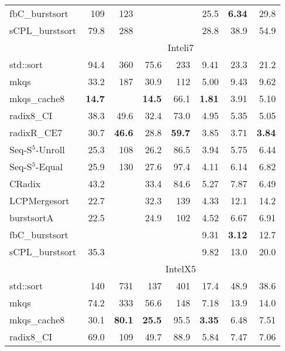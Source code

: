 \documentclass[a4paper]{myjournal}
\begin{document}
\begin{table}[p]
\begin{tabular}{l|rrrr rrr|}
  fbC\_burstsort &      109 &     123 &          &         &     25.5 & \bf 6.34 &     29.8 \\
 sCPL\_burstsort &     79.8 &     288 &          &         &     28.8 &     38.9 &     54.9 \\ \hline
& \multicolumn{7}{c|}{Inteli7} \\ \cline{2-8}
std::sort &     94.4 &      360 &     75.6 &      233 &     9.41 &     23.3 &     21.2 \\
            mkqs &     33.2 &      187 &     30.9 &      112 &     5.00 &     9.43 &     9.62 \\
    mkqs\_cache8 & \bf 14.7 &          & \bf 14.5 &     66.1 & \bf 1.81 &     3.91 &     5.10 \\
      radix8\_CI &     38.3 &     49.6 &     32.4 &     73.0 &     4.95 &     5.35 &     5.05 \\
     radixR\_CE7 &     30.7 & \bf 46.6 &     28.8 & \bf 59.7 &     3.85 &     3.71 & \bf 3.84 \\
Seq-S$^5$-Unroll &     25.3 &      108 &     26.2 &     86.5 &     3.94 &     5.75 &     6.44 \\
 Seq-S$^5$-Equal &     25.9 &      130 &     27.6 &     97.4 &     4.11 &     6.14 &     6.82 \\
          CRadix &     43.2 &          &     33.4 &     84.6 &     5.27 &     7.87 &     6.49 \\
    LCPMergesort &     22.7 &          &     32.3 &      139 &     4.33 &     12.1 &     14.2 \\
      burstsortA &     22.5 &          &     24.9 &      102 &     4.52 &     6.67 &     6.91 \\
  fbC\_burstsort &          &          &          &          &     9.31 & \bf 3.12 &     12.7 \\
 sCPL\_burstsort &     35.3 &          &          &          &     9.82 &     13.0 &     20.0 \\ \hline
& \multicolumn{7}{c|}{IntelX5} \\ \cline{2-8}
std::sort &      140 &      731 &      137 &      401 &     17.4 &     48.9 &     38.6 \\
            mkqs &     74.2 &      333 &     56.6 &      148 &     7.18 &     13.9 &     14.0 \\
    mkqs\_cache8 &     30.1 & \bf 80.1 & \bf 25.5 &     95.5 & \bf 3.35 &     6.48 &     7.51 \\
      radix8\_CI &     69.0 &      109 &     49.7 &     88.9 &     5.84 &     7.47 &     7.06 \\

\end{tabular}
\end{table}
\end{document}
